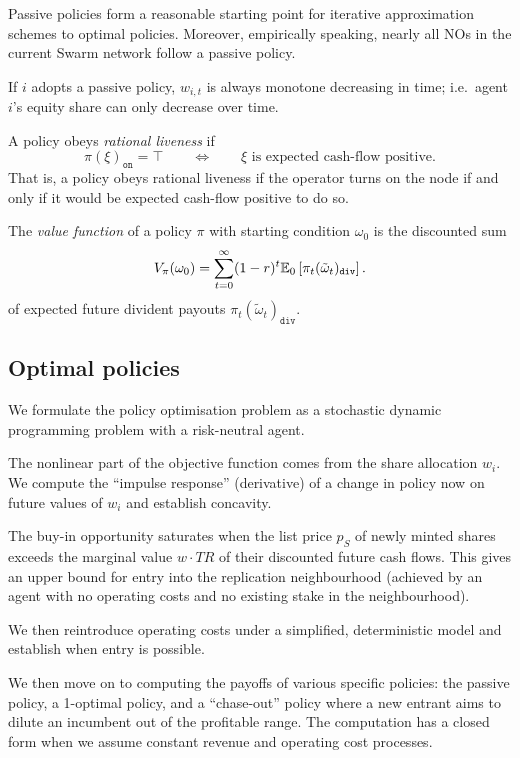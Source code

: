 Passive policies form a reasonable starting point for iterative approximation schemes to optimal policies.
%
Moreover, empirically speaking, nearly all NOs in the current Swarm network follow a passive policy.

If $i$ adopts a passive policy, $w_{i,t}$ is always monotone decreasing in time; i.e.~agent $i$'s equity share can only decrease over time.

\begin{definition}
  \label{def:rational-liveness}

%
A policy obeys \emph{rational liveness} if 
\[
  \pi(\xi)_\mathtt{on} = \top \qquad \Leftrightarrow \qquad \xi\text{ is expected cash-flow positive}.
\]
That is, a policy obeys rational liveness if the operator turns on the node if and only if it would be expected cash-flow positive to do so.
\end{definition}

\begin{definition}
  \label{def:policy-value}

  The \emph{value function} of a policy $\pi$ with starting condition $\omega_0$ is the discounted sum
  \[
    V_\pi(\omega_0) = \sum_{t=0}^\infty (1-r)^t\mathbb{E}_0 \left[ \pi_t(\tilde{\omega}_t)_\mathtt{div} \right].
  \]
  of expected future divident payouts $\pi_t(\tilde{\omega}_t)_\mathtt{div}$.

\end{definition}


\subsection{Optimal policies}
\label{section:optimal}

\begin{notes}
  \item We formulate the policy optimisation problem as a stochastic dynamic programming problem with a risk-neutral agent.
  \item The nonlinear part of the objective function comes from the share allocation $w_i$. We compute the ``impulse response'' (derivative) of a change in policy now on future values of $w_i$ and establish concavity.
  \item The buy-in opportunity saturates when the list price $p_S$ of newly minted shares exceeds the marginal value $w\cdot TR$ of their discounted future cash flows. This gives an upper bound for entry into the replication neighbourhood (achieved by an agent with no operating costs and no existing stake in the neighbourhood).

  We then reintroduce operating costs under a simplified, deterministic model and establish when entry is possible.
  \item We then move on to computing the payoffs of various specific policies: the passive policy, a 1-optimal policy, and a ``chase-out'' policy where a new entrant aims to dilute an incumbent out of the profitable range. The computation has a closed form when we assume constant revenue and operating cost processes.
\end{notes}



